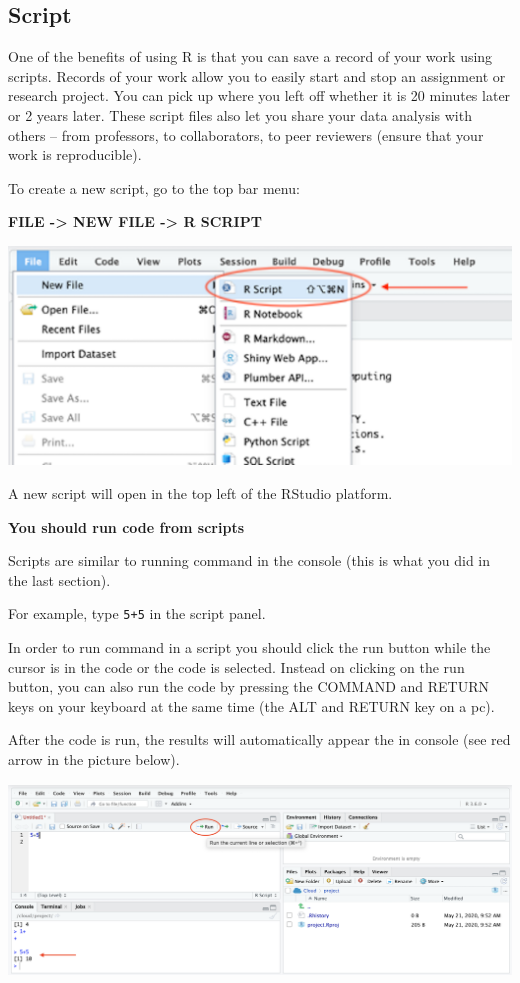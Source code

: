 \documentclass[
]{book}
\begin{document}
\hypertarget{script}{%
\subsection{Script}\label{script}}

One of the benefits of using R is that you can save a record of your work using scripts. Records of your work allow you to easily start and stop an assignment or research project. You can pick up where you left off whether it is 20 minutes later or 2 years later. These script files also let you share your data analysis with others -- from professors, to collaborators, to peer reviewers (ensure that your work is reproducible).

To create a new script, go to the top bar menu:

\textbf{FILE -\textgreater{} NEW FILE -\textgreater{} R SCRIPT}

\includegraphics{img/newscript.png}

A new script will open in the top left of the RStudio platform.

\textbf{You should run code from scripts}

Scripts are similar to running command in the console (this is what you did in the last section).

For example, type \texttt{5+5} in the script panel.

In order to run command in a script you should click the run button while the cursor is in the code or the code is selected. Instead on clicking on the run button, you can also run the code by pressing the COMMAND and RETURN keys on your keyboard at the same time (the ALT and RETURN key on a pc).

After the code is run, the results will automatically appear the in console (see red arrow in the picture below).

\includegraphics{img/script.png}
\end{document}
